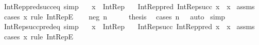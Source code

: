 \begin{isabellebody}
{\isafoldproof}%
%
\isadelimproof
\isanewline
%
\endisadelimproof
\isanewline
{}\isamarkupfalse%
\ Int{\isacharunderscore}{\kern0pt}Rep{\isacharunderscore}{\kern0pt}pred{\isacharunderscore}{\kern0pt}succ{\isacharunderscore}{\kern0pt}eq\ {\isacharbrackleft}{\kern0pt}simp{\isacharbrackright}{\kern0pt}{\isacharcolon}{\kern0pt}\isanewline
\ \ \ {\isachardoublequoteopen}x\ {\isacharcolon}{\kern0pt}\ Int{\isacharunderscore}{\kern0pt}Rep{\isachardoublequoteclose}\isanewline
\ \ \ {\isachardoublequoteopen}Int{\isacharunderscore}{\kern0pt}Rep{\isacharunderscore}{\kern0pt}pred\ {\isacharparenleft}{\kern0pt}Int{\isacharunderscore}{\kern0pt}Rep{\isacharunderscore}{\kern0pt}succ\ x{\isacharparenright}{\kern0pt}\ {\isacharequal}{\kern0pt}\ x{\isachardoublequoteclose}\isanewline
%
\isadelimproof
%
\endisadelimproof
%
\isatagproof
{}\isamarkupfalse%
\ assms\isanewline
{}\isamarkupfalse%
\ {\isacharparenleft}{\kern0pt}cases\ x\ rule{\isacharcolon}{\kern0pt}\ Int{\isacharunderscore}{\kern0pt}RepE{\isacharparenright}{\kern0pt}\isanewline
\ \ \isamarkupfalse%
\ {\isacharparenleft}{\kern0pt}neg\ n{\isacharparenright}{\kern0pt}\isanewline
\ \ \isamarkupfalse%
\ \isamarkupfalse%
\ {\isacharquery}{\kern0pt}thesis\ \isamarkupfalse%
\ {\isacharparenleft}{\kern0pt}cases\ {\isachardoublequoteopen}n\ {\isacharequal}{\kern0pt}\ {}{\isachardoublequoteclose}{\isacharparenright}{\kern0pt}\ auto\isanewline
{}\isamarkupfalse%
\ simp%
\endisatagproof
{\isafoldproof}%
%
\isadelimproof
\isanewline
%
\endisadelimproof
\isanewline
{}\isamarkupfalse%
\ Int{\isacharunderscore}{\kern0pt}Rep{\isacharunderscore}{\kern0pt}succ{\isacharunderscore}{\kern0pt}pred{\isacharunderscore}{\kern0pt}eq\ {\isacharbrackleft}{\kern0pt}simp{\isacharbrackright}{\kern0pt}{\isacharcolon}{\kern0pt}\isanewline
\ \ \ {\isachardoublequoteopen}x\ {\isacharcolon}{\kern0pt}\ Int{\isacharunderscore}{\kern0pt}Rep{\isachardoublequoteclose}\isanewline
\ \ \ {\isachardoublequoteopen}Int{\isacharunderscore}{\kern0pt}Rep{\isacharunderscore}{\kern0pt}succ\ {\isacharparenleft}{\kern0pt}Int{\isacharunderscore}{\kern0pt}Rep{\isacharunderscore}{\kern0pt}pred\ x{\isacharparenright}{\kern0pt}\ {\isacharequal}{\kern0pt}\ x{\isachardoublequoteclose}\isanewline
%
\isadelimproof
%
\endisadelimproof
%
\isatagproof
{}\isamarkupfalse%
\ assms\isanewline
{}\isamarkupfalse%
\ {\isacharparenleft}{\kern0pt}cases\ x\ rule{\isacharcolon}{\kern0pt}\ Int{\isacharunderscore}{\kern0pt}RepE{\isacharparenright}{\kern0pt}\isanewline

\end{isabellebody}
